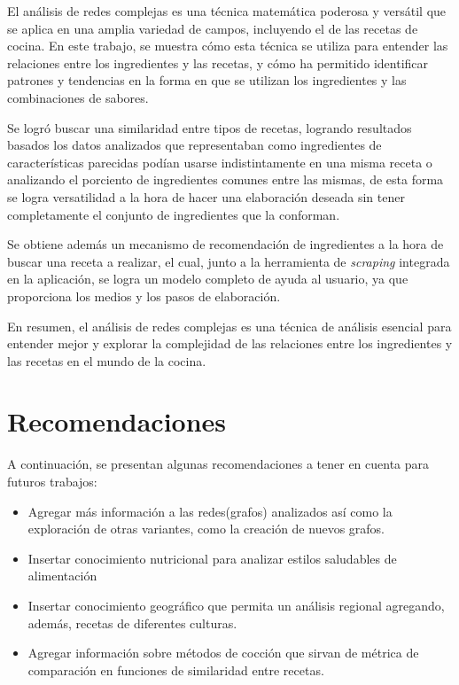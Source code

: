 \documentclass[a4paper]{article}
\begin{document}
El análisis de redes complejas es una técnica matemática poderosa y versátil que
se aplica en una amplia variedad de campos, incluyendo el de las recetas de
cocina. En este trabajo, se muestra cómo esta técnica se utiliza para entender
las relaciones entre los ingredientes y las recetas, y cómo ha permitido
identificar patrones y tendencias en la forma en que se utilizan los
ingredientes y las combinaciones de sabores.

Se logró buscar una similaridad entre tipos de recetas, logrando resultados
basados los datos analizados que representaban como ingredientes de
características parecidas podían usarse indistintamente en una misma receta o
analizando el porciento de ingredientes comunes entre las mismas, de esta forma
se logra versatilidad a la hora de hacer una elaboración deseada sin tener
completamente el conjunto de ingredientes que la conforman.

Se obtiene además un mecanismo de recomendación de ingredientes a la hora de
buscar una receta a realizar, el cual, junto a la herramienta de \emph{scraping}
integrada en la aplicación, se logra un modelo completo de ayuda al usuario, ya
que proporciona los medios y los pasos de elaboración.

En resumen, el análisis de redes complejas es una técnica de análisis esencial
para entender mejor y explorar la complejidad de las relaciones entre los
ingredientes y las recetas en el mundo de la cocina.




\section{Recomendaciones}\label{sec:rec}

A continuación, se presentan algunas recomendaciones a tener en cuenta para
futuros trabajos:
\begin{itemize}
	\item Agregar más información a las redes(grafos) analizados así como la
	exploración de otras variantes, como la creación de nuevos grafos.
	\item Insertar conocimiento nutricional para analizar estilos saludables de
	alimentación
	\item Insertar conocimiento geográfico que permita un análisis regional
	agregando, además, recetas de diferentes culturas.
	\item Agregar información sobre métodos de cocción que sirvan de métrica de
	comparación en funciones de similaridad entre recetas.
\end{itemize}
\end{document}
